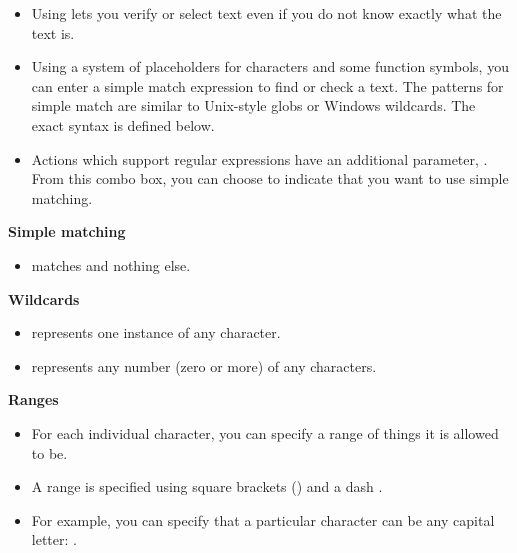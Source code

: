 

\begin{itemize}
\item Using  lets you verify or select text even if you do not know exactly what the text is.
\item Using a system of placeholders for characters and some function symbols, you can enter a simple match expression to find or check a text. The patterns for simple match are similar to Unix-style globs or Windows wildcards. The exact syntax is defined below.
\item Actions which support regular expressions have an additional parameter, . From this combo box, you can choose  to indicate that you want to use simple matching.
\end{itemize}

\textbf{Simple matching}
\begin{itemize}
\item {} matches  and nothing else.
\end{itemize}

\textbf{Wildcards}
\begin{itemize}
\item {} represents one instance of any character.
\item \bxshell{*} represents any number (zero or more) of any characters.  
\end{itemize}



\textbf{Ranges}
\begin{itemize}
\item For each individual character, you can specify a range of things it is allowed to be. 
\item A range is specified using square brackets (\bxshell{[]}) and a dash \bxshell{-}. 
\item For example, you can specify that a particular character can be any capital letter: \bxshell{[A-Z]}.
\end{itemize}

